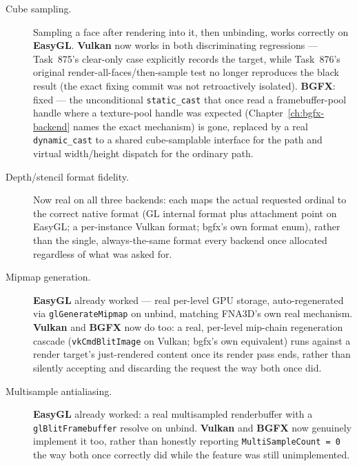 \begin{description}
  \item[Cube sampling.] Sampling a  face after rendering into it,
        then unbinding, works correctly on \textbf{EasyGL}. \textbf{Vulkan} now works in both
        discriminating
        regressions --- Task~875's clear-only case explicitly records the target, while
        Task~876's original render-all-faces/then-sample test no longer reproduces the black
        result (the exact fixing commit was not retroactively isolated).
        \textbf{BGFX}: fixed --- the unconditional \texttt{static\_cast} that once read a
        framebuffer-pool handle where a texture-pool handle was expected
        (Chapter~\ref{ch:bgfx-backend} names the exact mechanism) is gone, replaced by a real
        \texttt{dynamic\_cast} to a shared cube-samplable interface for the
         path and virtual width/height dispatch for the ordinary
         path.
  \item[Depth/stencil format fidelity.] Now real on all three backends: each maps the actual
        requested  ordinal to the correct native format (GL internal
        format plus attachment point on EasyGL; a per-instance Vulkan format; bgfx's own
        format enum), rather than the single, always-the-same format every backend once
        allocated regardless of what was asked for.
  \item[Mipmap generation.] \textbf{EasyGL} already worked --- real per-level GPU storage,
        auto-regenerated via \texttt{glGenerateMipmap} on unbind, matching FNA3D's own real
        mechanism. \textbf{Vulkan} and \textbf{BGFX} now do too: a real, per-level mip-chain
        regeneration cascade (\texttt{vkCmdBlitImage} on Vulkan; bgfx's own equivalent) runs
        against a render target's just-rendered content once its render pass ends, rather than
        silently accepting and discarding the request the way both once did.
  \item[Multisample antialiasing.] \textbf{EasyGL} already worked: a real multisampled
        renderbuffer with a \texttt{glBlitFramebuffer} resolve on unbind. \textbf{Vulkan} and
        \textbf{BGFX} now genuinely implement it too, rather than honestly reporting
        \texttt{MultiSampleCount = 0} the way both once correctly did while the feature was
        still unimplemented.
\end{description}

